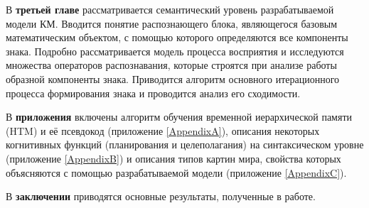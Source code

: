 В \textbf{третьей главе} рассматривается семантический уровень разрабатываемой модели КМ. Вводится понятие распознающего блока, являющегося базовым математическим объектом, с помощью которого определяются все компоненты знака. Подробно рассматривается модель процесса восприятия и исследуются множества операторов распознавания, которые строятся при анализе работы образной компоненты знака. Приводится алгоритм основного итерационного процесса формирования знака и проводится анализ его сходимости.

В \textbf{приложения} включены алгоритм обучения временной иерархической памяти (HTM) и её псевдокод (приложение \ref{AppendixA}), описания некоторых когнитивных функций (планирования и целеполагания) на синтаксическом уровне (приложение \ref{AppendixB}) и описания типов картин мира, свойства которых объясняются с помощью разрабатываемой модели (приложение \ref{AppendixC}).

В \textbf{заключении} приводятся основные результаты, полученные в работе.
\clearpage